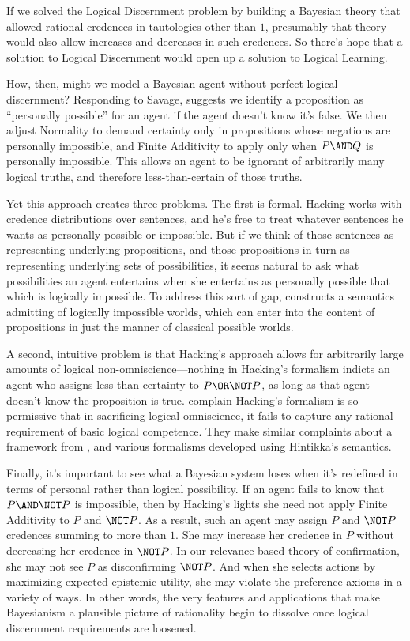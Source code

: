 If we solved the Logical Discernment problem by building a Bayesian theory that allowed rational credences in tautologies other than $1$, presumably that theory would also allow increases and decreases in such credences. So there's hope that a solution to Logical Discernment would open up a solution to Logical Learning.

How, then, might we model a Bayesian agent without perfect logical discernment? Responding to Savage, \citet{HackingMoreRealistic} suggests we identify a proposition as ``personally possible'' for an agent if the agent doesn't know it's false. We then adjust Normality to demand certainty only in propositions whose negations are personally impossible, and Finite Additivity to apply only when $P \AND Q$ is personally impossible. This allows an agent to be ignorant of arbitrarily many logical truths, and therefore less-than-certain of those truths. 

Yet this approach creates three problems. The first is formal. Hacking works with credence distributions over sentences, and he's free to treat whatever sentences he wants as personally possible or impossible. But if we think of those sentences as representing underlying propositions, and those propositions in turn as representing underlying sets of possibilities, it seems natural to ask what possibilities an agent entertains when she entertains as personally possible that which is logically impossible. To address this sort of gap, \citet{HintikkaImpossible} constructs a semantics admitting of logically impossible worlds, which can enter into the content of propositions in just the manner of classical possible worlds.

A second, intuitive problem is that Hacking's approach allows for arbitrarily large amounts of logical non-omniscience---nothing in Hacking's formalism indicts an agent who assigns less-than-certainty to $P \OR \NOT P$, as long as that agent doesn't know the proposition is true. \citet{BjerringSkipperJoe} complain Hacking's formalism is so permissive that in sacrificing logical omniscience, it fails to capture any rational requirement of basic logical competence. They make similar complaints about a framework from \citet{Garber}, and various formalisms developed using Hintikka's semantics.

Finally, it's important to see what a Bayesian system loses when it's redefined in terms of personal rather than logical possibility. If an agent fails to know that $P \AND \NOT P$ is impossible, then by Hacking's lights she need not apply Finite Additivity to $P$ and $\NOT P$. As a result, such an agent may assign $P$ and $\NOT P$ credences summing to more than $1$. She may increase her credence in $P$ without decreasing her credence in $\NOT P$. In our relevance-based theory of confirmation, she may not see $P$ as disconfirming $\NOT P$. And when she selects actions by maximizing expected epistemic utility, she may violate the preference axioms in a variety of ways. In other words, the very features and applications that make Bayesianism a plausible picture of rationality begin to dissolve once logical discernment requirements are loosened.

